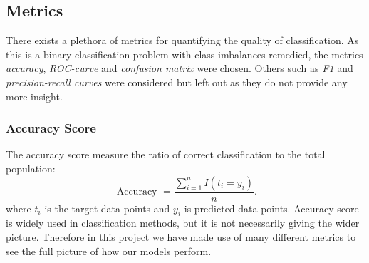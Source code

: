 \subsection{Metrics}\label{sec: Metrics}

There exists a plethora of metrics for quantifying the quality of classification.
As this is a binary classification problem with class imbalances remedied, the metrics
\textit{accuracy}, \textit{ROC-curve} and \textit{confusion matrix} were chosen. Others such as \textit{F1} and \textit{precision-recall curves} were considered but left out
as they do not provide any more insight.
\subsubsection{Accuracy Score} \label{accuracy}
The accuracy score measure the ratio of correct classification to the total population:
\begin{equation}
    \text { Accuracy }=\frac{\sum_{i=1}^{n} I\left(t_{i}=y_{i}\right)}{n}.
\end{equation}
where $t_i$ is the target data points and $y_i$ is predicted data points. Accuracy score is widely used in classification methods, but it is not necessarily giving the wider picture. Therefore in this project we have made use of many different metrics to see the full picture of how our models perform.  

